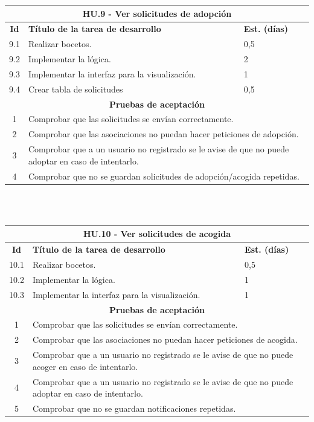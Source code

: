 \begin{tabular}{|c|p{9.5cm}|p{1cm}|}
	\hline
	\multicolumn{3}{|c|}{\textbf{HU.9 - Ver solicitudes de adopción}} \\
	\hline
	\textbf{Id} & \textbf{Título de la tarea de desarrollo} & \textbf{Est. (días)} \\
	\hline
	9.1 & Realizar bocetos. & 0,5 \\ \hline
	9.2 &  Implementar la lógica. & 2 \\ \hline
	9.3 &  Implementar la interfaz para la visualización. & 1 \\ \hline
	9.4 &  Crear tabla de solicitudes & 0,5 \\ \hline
	\multicolumn{3}{|c|}{\textbf{Pruebas de aceptación}} \\ \hline
	1 & \multicolumn{2}{|p{10cm}|}{Comprobar que las solicitudes se envían correctamente.} \\ \hline
	2 & \multicolumn{2}{|p{10cm}|}{Comprobar que las asociaciones no puedan hacer peticiones de adopción.} \\ \hline
	3 & \multicolumn{2}{|p{10cm}|}{Comprobar que a un usuario no registrado se le avise de que no puede adoptar en caso de intentarlo.} \\ \hline
	4 & \multicolumn{2}{|p{10cm}|}{Comprobar que no se guardan solicitudes de adopción/acogida repetidas.} \\ \hline
	
	
\end{tabular} \\ \\

\begin{tabular}{|c|p{9.5cm}|p{1cm}|}
	\hline
	\multicolumn{3}{|c|}{\textbf{HU.10 - Ver solicitudes de acogida}} \\
	\hline
	\textbf{Id} & \textbf{Título de la tarea de desarrollo} & \textbf{Est. (días)} \\
	\hline
	10.1 & Realizar bocetos. & 0,5 \\ \hline
	10.2 &  Implementar la lógica. & 1 \\ \hline
	10.3 &  Implementar la interfaz para la visualización. & 1 \\ \hline
	\multicolumn{3}{|c|}{\textbf{Pruebas de aceptación}} \\ \hline
	1 & \multicolumn{2}{|p{10cm}|}{Comprobar que las solicitudes se envían correctamente.} \\ \hline
	2 & \multicolumn{2}{|p{10cm}|}{Comprobar que las asociaciones no puedan hacer peticiones de acogida.} \\ \hline
	3 & \multicolumn{2}{|p{10cm}|}{Comprobar que a un usuario no registrado se le avise de que no puede acoger en caso de intentarlo.} \\ \hline
	4 & \multicolumn{2}{|p{10cm}|}{Comprobar que a un usuario no registrado se le avise de que no puede adoptar en caso de intentarlo.} \\ \hline
	5 & \multicolumn{2}{|p{10cm}|}{Comprobar que no se guardan notificaciones repetidas.} \\ \hline
	
\end{tabular} \\ \\

